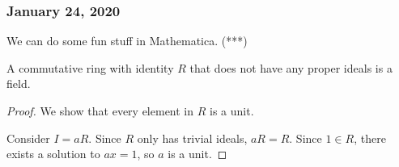 \subsubsection*{January 24, 2020}

We can do some fun stuff in Mathematica. (***)

\begin{proposition}
	A commutative ring with identity $R$ that does not have any proper ideals is a field. 
\end{proposition}
\begin{proof}
	We show that every element in $R$ is a unit. 
	
	Consider $I=aR$. Since $R$ only has trivial ideals, $aR=R$. Since $1\in R$, there exists a solution to $ax=1$, so $a$ is a unit. 
\end{proof}
